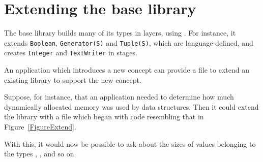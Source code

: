 \section{Extending the base \asharp{} library}

The base \asharp{} library builds many of its types in layers, 
{ using} .
For instance, it extends
\verb"Boolean", \verb"Generator(S)" and \verb"Tuple(S)",
which are language-defined,
and creates \verb"Integer" and \verb"TextWriter" in stages.

An application which introduces a new concept can provide a file
to extend an existing library to support the new concept.

Suppose, for instance, that an application needed to determine how much
dynamically allocated memory was used by data structures.
Then it could extend the \asharp{} library with a file which began
with code resembling that in Figure~\ref{FigureExtend}.

With this, it would now be possible to ask about the sizes of 
values belonging to the types , , and
so on.

